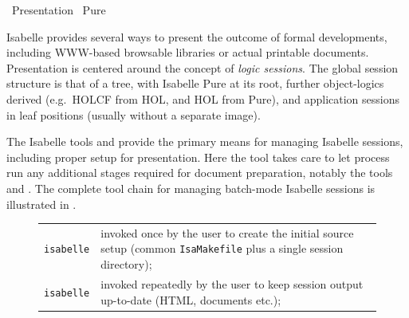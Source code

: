 %
\begin{isabellebody}%
\def\isabellecontext{Presentation}%
%
\isadelimtheory
\isanewline
\isanewline
%
\endisadelimtheory
%
\isatagtheory
{}\isamarkupfalse%
\ Presentation\isanewline
{}\ Pure\isanewline
{}%
\endisatagtheory
{\isafoldtheory}%
%
\isadelimtheory
%
\endisadelimtheory
%
\isamarkuptrue%
%
\begin{isamarkuptext}%
Isabelle provides several ways to present the outcome of formal
  developments, including WWW-based browsable libraries or actual
  printable documents.  Presentation is centered around the concept of
  \emph{logic sessions}.  The global session structure is that of a
  tree, with Isabelle Pure at its root, further object-logics derived
  (e.g.\ HOLCF from HOL, and HOL from Pure), and application sessions
  in leaf positions (usually without a separate image).

  The Isabelle tools \hyperlink{tool.mkdir}{\mbox{}} and \hyperlink{tool.make}{\mbox{}} provide
  the primary means for managing Isabelle sessions, including proper
  setup for presentation.  Here the \hyperlink{tool.usedir}{\mbox{}} tool takes care
  to let \hyperlink{executable.isabelle-process}{\mbox{}} process run any
  additional stages required for document preparation, notably the
  tools \hyperlink{tool.document}{\mbox{}} and \hyperlink{tool.latex}{\mbox{}}.  The complete tool
  chain for managing batch-mode Isabelle sessions is illustrated in
  .

  \begin{figure}[htbp]
  \begin{center}
  \begin{tabular}{lp{}}

      \verb|isabelle| \indexref{}{tool}{mkdir}\hyperlink{tool.mkdir}{\mbox{\isa{\isatt{mkdir}}}} & invoked once by the user
      to create the initial source setup (common \verb|IsaMakefile| plus a single session directory); \\

      \verb|isabelle| \hyperlink{tool.make}{\mbox{\isa{\isatt{make}}}} & invoked repeatedly by the
      user to keep session output up-to-date (HTML, documents etc.); \\


\end{tabular}
\end{center}
\end{figure}
\end{isamarkuptext}
\end{isabellebody}

